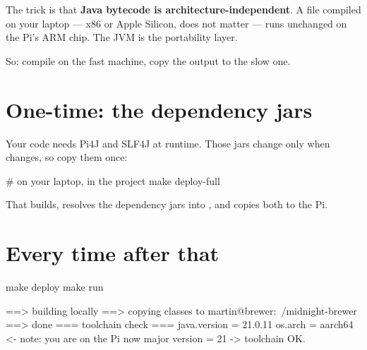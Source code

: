 The trick is that \textbf{Java bytecode is architecture-independent}. A
 file compiled on your laptop --- x86 or Apple Silicon, does not
matter --- runs unchanged on the Pi's ARM chip. The JVM is the portability layer.

So: compile on the fast machine, copy the output to the slow one.

\begin{center}
\end{center}

\section{One-time: the dependency jars}

Your code needs Pi4J and SLF4J at runtime. Those jars change only when
 changes, so copy them once:

\begin{shell}
# on your laptop, in the project
make deploy-full
\end{shell}

That builds, resolves the dependency jars into , and
copies both to the Pi.

\section{Every time after that}

\begin{shell}
make deploy
make run
\end{shell}

\begin{trace}
==> building locally
==> copying classes to martin@brewer:~/midnight-brewer
==> done
=== toolchain check ===
java.version    = 21.0.11
os.arch         = aarch64            <- note: you are on the Pi now
major version   = 21
  -> toolchain OK.
\end{trace}

